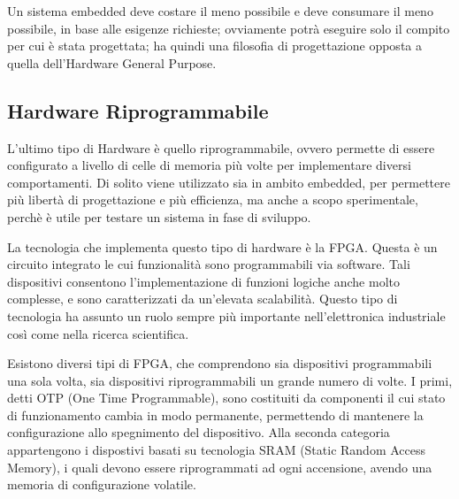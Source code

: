 \documentclass[a4paper,titlepage]{book}
\begin{document}
Un sistema embedded deve costare il meno possibile e deve consumare il meno possibile, in base alle esigenze richieste; ovviamente potrà eseguire solo il compito per cui è stata progettata; ha quindi una filosofia di progettazione opposta a quella dell'Hardware General Purpose.

\subsection{Hardware Riprogrammabile}
L'ultimo tipo di Hardware è quello riprogrammabile, ovvero permette di essere configurato a livello di celle di memoria più volte per implementare diversi comportamenti. Di solito viene utilizzato sia in ambito embedded, per permettere più libertà di progettazione e più efficienza, ma anche a scopo sperimentale, perchè è utile per testare un sistema in fase di sviluppo.

La tecnologia che implementa questo tipo di hardware è la FPGA. Questa è un circuito integrato le cui funzionalità sono programmabili via software. Tali dispositivi consentono l'implementazione di funzioni logiche anche molto complesse, e sono caratterizzati da un'elevata scalabilità. Questo tipo di tecnologia ha assunto un ruolo sempre più importante nell'elettronica industriale così come nella ricerca scientifica.

Esistono diversi tipi di FPGA, che comprendono sia dispositivi programmabili una sola volta, sia dispositivi riprogrammabili un grande numero di volte. I primi, detti OTP (One Time Programmable), sono costituiti da componenti il cui stato di funzionamento cambia in modo permanente, permettendo di mantenere la configurazione allo spegnimento del dispositivo. Alla seconda categoria appartengono i dispostivi basati su tecnologia SRAM (Static Random Access Memory), i quali devono essere riprogrammati ad ogni accensione, avendo una memoria di configurazione volatile.
\end{document}
